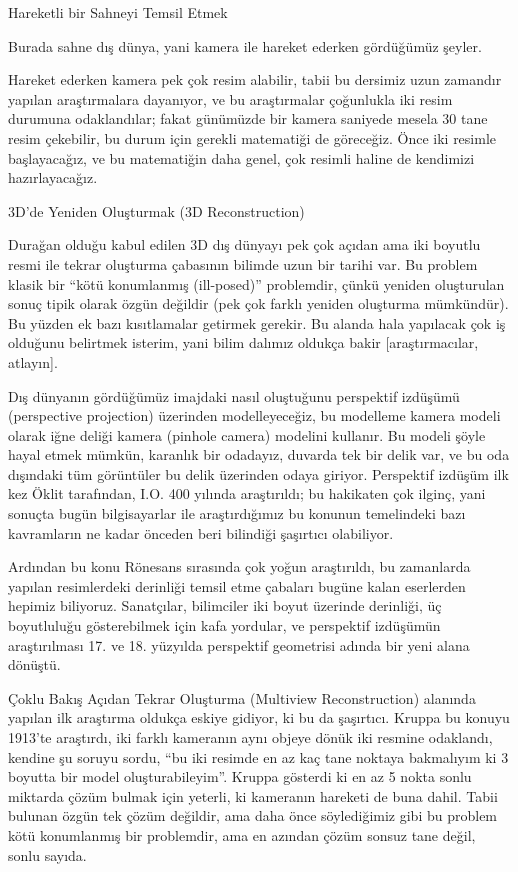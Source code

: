 \documentclass[12pt,fleqn]{article}\usepackage{../../common}
\begin{document}
Hareketli bir Sahneyi Temsil Etmek

Burada sahne dış dünya, yani kamera ile hareket ederken gördüğümüz şeyler. 

Hareket ederken kamera pek çok resim alabilir, tabii bu dersimiz uzun
zamandır yapılan araştırmalara dayanıyor, ve bu araştırmalar çoğunlukla iki
resim durumuna odaklandılar; fakat günümüzde bir kamera saniyede mesela 30
tane resim çekebilir, bu durum için gerekli matematiği de göreceğiz. Önce
iki resimle başlayacağız, ve bu matematiğin daha genel, çok resimli haline
de kendimizi hazırlayacağız. 

3D'de Yeniden Oluşturmak (3D Reconstruction)

Durağan olduğu kabul edilen 3D dış dünyayı pek çok açıdan ama iki boyutlu
resmi ile tekrar oluşturma çabasının bilimde uzun bir tarihi var. Bu
problem klasik bir ``kötü konumlanmış (ill-posed)'' problemdir, çünkü
yeniden oluşturulan sonuç tipik olarak özgün değildir (pek çok farklı
yeniden oluşturma mümkündür). Bu yüzden ek bazı kısıtlamalar getirmek
gerekir. Bu alanda hala yapılacak çok iş olduğunu belirtmek isterim, yani
bilim dalımız oldukça bakir [araştırmacılar, atlayın]. 

Dış dünyanın gördüğümüz imajdaki nasıl oluştuğunu perspektif izdüşümü
(perspective projection) üzerinden modelleyeceğiz, bu modelleme kamera modeli
olarak iğne deliği kamera (pinhole camera) modelini kullanır. Bu modeli şöyle
hayal etmek mümkün, karanlık bir odadayız, duvarda tek bir delik var, ve bu oda
dışındaki tüm görüntüler bu delik üzerinden odaya giriyor. Perspektif izdüşüm
ilk kez Öklit tarafından, I.O. 400 yılında araştırıldı; bu hakikaten çok ilginç,
yani sonuçta bugün bilgisayarlar ile araştırdığımız bu konunun temelindeki bazı
kavramların ne kadar önceden beri bilindiği şaşırtıcı olabiliyor.

Ardından bu konu Rönesans sırasında çok yoğun araştırıldı, bu zamanlarda
yapılan resimlerdeki derinliği temsil etme çabaları bugüne kalan eserlerden
hepimiz biliyoruz. Sanatçılar, bilimciler iki boyut üzerinde derinliği, üç
boyutluluğu gösterebilmek için kafa yordular, ve perspektif izdüşümün
araştırılması 17. ve 18. yüzyılda perspektif geometrisi adında bir yeni alana
dönüştü.

Çoklu Bakış Açıdan Tekrar Oluşturma (Multiview Reconstruction) alanında
yapılan ilk araştırma oldukça eskiye gidiyor, ki bu da şaşırtıcı. Kruppa bu
konuyu 1913'te araştırdı, iki farklı kameranın aynı objeye dönük iki
resmine odaklandı, kendine şu soruyu sordu, ``bu iki resimde en az kaç tane
noktaya bakmalıyım ki 3 boyutta bir model oluşturabileyim''. Kruppa
gösterdi ki en az 5 nokta sonlu miktarda çözüm bulmak için yeterli, ki
kameranın hareketi de buna dahil. Tabii bulunan özgün tek çözüm değildir,
ama daha önce söylediğimiz gibi bu problem kötü konumlanmış bir problemdir,
ama en azından çözüm sonsuz tane değil, sonlu sayıda.
\end{document}
